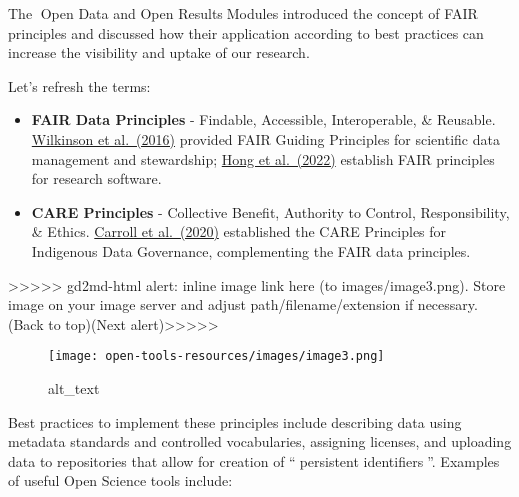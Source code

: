 \documentclass[
  letterpaper,
  DIV=11,
  numbers=noendperiod]{scrreport}
\providecommand{\tightlist}{%
  \setlength{\itemsep}{0pt}\setlength{\parskip}{0pt}}\usepackage{longtable,booktabs,array}
\begin{document}
The 🔗Open Data and Open Results🔗Modules introduced the concept of FAIR
principles and discussed how their application according to best
practices can increase the visibility and uptake of our research.

Let's refresh the terms:

\begin{itemize}
\tightlist
\item
  \textbf{FAIR Data Principles} - Findable, Accessible, Interoperable,
  \& Reusable. \href{https://doi.org/10.1038/sdata.2016.18}{Wilkinson et
  al.~(2016)} provided FAIR Guiding Principles for scientific data
  management and stewardship;
  \href{https://doi.org/10.15497/RDA00068}{Hong et al.~(2022)} establish
  FAIR principles for research software.
\item
  \textbf{CARE Principles} - Collective Benefit, Authority to Control,
  Responsibility, \& Ethics.
  \href{http://doi.org/10.5334/dsj-2020-043}{Carroll et al.~(2020)}
  established the CARE Principles for Indigenous Data Governance,
  complementing the FAIR data principles.
\end{itemize}

{\textgreater\textgreater\textgreater\textgreater\textgreater{}
gd2md-html alert: inline image link here (to images/image3.png). Store
image on your image server and adjust path/filename/extension if
necessary. }(Back to top)(Next
alert){\textgreater\textgreater\textgreater\textgreater\textgreater{} }

\begin{figure}

{\centering \texttt{[image: open-tools-resources/images/image3.png]}

}

\caption{alt\_text}

\end{figure}

Best practices to implement these principles include describing data
using metadata standards and controlled vocabularies, assigning
licenses, and uploading data to repositories that allow for creation of
``📖{persistent identifiers📖}''. Examples of useful Open Science tools
include:
\end{document}
